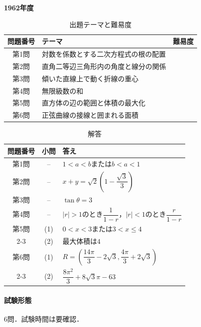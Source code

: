 \documentclass[../../main.tex]{subfiles}
\begin{document}
\begin{center}
  {\fontsize{48pt}{58pt}\selectfont \textbf{1962}\normalsize\textbf{年度}}
\end{center}

\begin{table}[htb]
  \centering
  \caption{出題テーマと難易度}
  \begin{tabular}{|c|p{9cm}|c|}
    \hline
    \textbf{問題番号} & \textbf{テーマ} & \textbf{難易度} \\
    \hline
    第1問 & 対数を係数とする二次方程式の根の配置 & \\
    \hline
    第2問 & 直角二等辺三角形内の角度と線分の関係 & \\
    \hline
    第3問 & 傾いた直線上で動く折線の重心 & \\
    \hline
    第4問 & 無限級数の和 & \\
    \hline
    第5問 & 直方体の辺の範囲と体積の最大化 & \\
    \hline
    第6問 & 正弦曲線の接線と囲まれる面積 & \\
    \hline
  \end{tabular}
\end{table}

\begin{table}[htb]
  \centering
  \caption{解答}
  \renewcommand{\arraystretch}{1.4}
  \begin{tabular}{|c|c|p{9cm}|}
    \hline
    \textbf{問題番号} & \textbf{小問} & \textbf{答え} \\
    \hline
    第1問 & -- & $1<a<b$または$b<a<1$ \\
    \hline
    第2問 & -- & $x+y=\sqrt{2}\left(1-\dfrac{\sqrt{3}}{3}\right)$ \\
    \hline
    第3問 & -- & $\tan\theta=3$ \\
    \hline
    第4問 & -- & $|r|>1$のとき$\dfrac{1}{1-r}$，$|r|<1$のとき$\dfrac{r}{1-r}$ \\
    \hline
    第5問 & (1) & $0<x<3$または$3<x\le 4$ \\
    \cline{2-3}
    & (2) & 最大体積は$4$ \\
    \hline
    第6問 & (1) & $R=(\dfrac{14\pi}{3}-2\sqrt{3},\dfrac{4\pi}{3}+2\sqrt{3})$ \\
    \cline{2-3}
    & (2) & $\dfrac{8\pi^2}{3}+8\sqrt{3}\pi-63$ \\
    \hline
  \end{tabular}
\end{table}

\paragraph{試験形態}
6問．試験時間は要確認．
\end{document}
